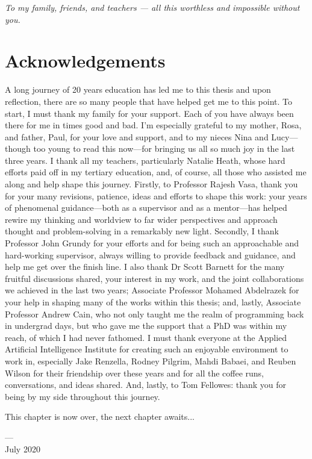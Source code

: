 \cleardoublepage
\pagestyle{empty}
\begin{center}
  \vspace*{0.3\paperheight}
  \textit{To my family, friends, and teachers --- all this worthless and impossible without you.}
\end{center}
\pagestyle{fancy}

\chapter*{Acknowledgements}

\vspace{-2\bigskipamount}

A long journey of 20 years education has led me to this thesis and upon reflection, there are so many people that have helped get me to this point. To start, I must thank my family for your support. Each of you have always been there for me in times good and bad. I'm especially grateful to my mother, Rosa, and father, Paul, for your love and support, and to my nieces Nina and Lucy---though too young to read this now---for bringing us all so much joy in the last three years. I thank all my teachers, particularly Natalie Heath, whose hard efforts paid off in my tertiary education, and, of course, all those who assisted me along and help shape this journey. Firstly, to Professor Rajesh Vasa, thank you for your many revisions, patience, ideas and efforts to shape this work: your years of phenomenal guidance---both as a supervisor and as a mentor---has helped rewire my thinking and worldview to far wider perspectives and approach thought and problem-solving in a remarkably new light. Secondly, I thank Professor John Grundy for your efforts and for being such an approachable and hard-working supervisor, always willing to provide feedback and guidance, and help me get over the finish line. I also thank Dr Scott Barnett for the many fruitful discussions shared, your interest in my work, and the joint collaborations we achieved in the last two years; Associate Professor Mohamed Abdelrazek for your help in shaping many of the works within this thesis; and, lastly, Associate Professor Andrew Cain, who not only taught me the realm of programming back in undergrad days, but who gave me the support that a PhD was within my reach, of which I had never fathomed. I must thank everyone at the Applied Artificial Intelligence Institute for creating such an enjoyable environment to work in, especially Jake Renzella, Rodney Pilgrim, Mahdi Babaei, and Reuben Wilson for their friendship over these years and for all the coffee runs, conversations, and ideas shared. And, lastly, to Tom Fellowes: thank you for being by my side throughout this journey. 

\bigskip
\noindent
This chapter is now over, the next chapter awaits...

\bigskip
\noindent
\hspace{\fill}
\parbox[b]{0.4\linewidth}{
\raggedleft
\small
--- \theauthor{}\\
July 2020
}